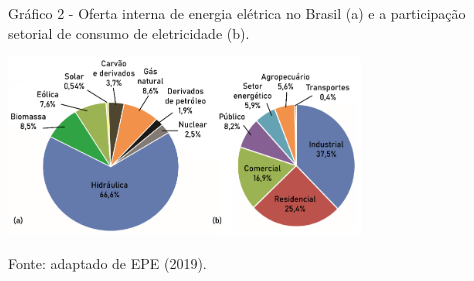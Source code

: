 \begin{onehalfspace}
        \begin{graph}
            \par \small Gráfico 2 - Oferta interna de energia elétrica no Brasil (a) e a participação setorial de consumo de eletricidade (b).
            \begin{minipage}[ht]{1\textwidth}\centering
                \includegraphics[width=0.7\textwidth]{graphs/graph1.png}            
            \end{minipage}
            \begin{flushleft}
                \par \small Fonte: adaptado de EPE (2019).            
            \end{flushleft}
        \end{graph}\pagebreak
    

\end{onehalfspace}
